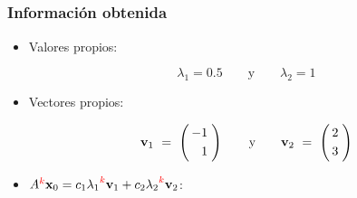 
\subsection{}

{\nologo
\begin{frame}\frametitle{Información obtenida}
	
	
	\begin{itemize}
		
		\vspace{2mm}		
		\item Valores propios:
		
		\[	
		\lambda_1 = 0.5 \qquad \text{y} \qquad \lambda_2 = 1
		\]
		
		\vspace{8mm}
		\item Vectores propios:
		
		\vspace{1mm}
		\[	
		\mathbf{v}_1
		\ = \	
		\left(
		\begin{array}{@{\hspace{0.3\tabcolsep}}r@{\hspace{0.5\tabcolsep}}}
		-1   \\[1mm]
		 1 
		\end{array}
		\right) 
		\qquad \text{y} \qquad
		\mathbf{v}_2
		\ = \	
		\left(
		\begin{array}{@{\hspace{0.3\tabcolsep}}c@{\hspace{0.5\tabcolsep}}}
		2   \\[1mm]
		3 
		\end{array}
		\right) 
		\]
		
		\vspace{8mm}
		\item $A^{\color{red}k}\mathbf{x}_0 = c_1{\lambda_1}^{\color{red}k}\mathbf{v}_1 + c_2{\lambda_2}^{\color{red}k}\mathbf{v}_2$:
		

\end{itemize}
\end{frame}}
